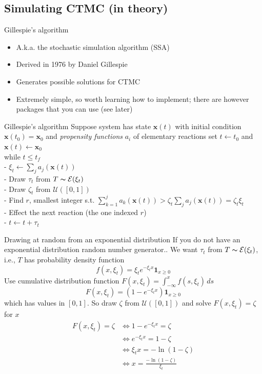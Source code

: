 \documentclass[aspectratio=169]{beamer}
\begin{document}
\subsection{Simulating CTMC (in theory)}

\begin{frame}{Gillespie's algorithm}
    \begin{itemize}
        \item A.k.a. the stochastic simulation algorithm (SSA)
        \item Derived in 1976 by Daniel Gillespie
        \item Generates possible solutions for CTMC
        \item Extremely simple, so worth learning how to implement; there are however packages that you can use (see later)
    \end{itemize}
\end{frame}


\begin{frame}{Gillespie's algorithm}
Suppose system has state $\mathbf{x}(t)$ with initial condition $\mathbf{x}(t_0)=\mathbf{x}_0$ and \emph{propensity functions} $a_i$ of elementary reactions
\vfill
set $t\leftarrow t_0$ and $\mathbf{x}(t)\leftarrow \mathbf{x}_0$\\
while {$t\leq t_f$}\\
- $\xi_t\leftarrow \sum_j a_j(\mathbf{x}(t))$\\
- Draw $\tau_t$ from $T\thicksim \mathcal{E}(\xi_t)$\\
- Draw $\zeta_t$ from $\mathcal{U}([0,1])$\\
- Find $r$, smallest integer s.t. $\sum_{k=1}^j a_k(\mathbf{x}(t))> \zeta_t\sum_j a_j(\mathbf{x}(t))=\zeta_t\xi_t$\\
- Effect the next reaction (the one indexed $r$)\\
- $t\leftarrow t+\tau_t$\\    
\end{frame}


\begin{frame}{Drawing at random from an exponential distribution}
    If you do not have an exponential distribution random number generator.. We want $\tau_t$ from $T\thicksim\mathcal{E}(\xi_t)$, i.e., $T$ has probability density function
    $$
    f(x,\xi_t)=
    \xi_te^{-\xi_t x}\mathbf{1}_{x\geq 0}
    $$
    Use cumulative distribution function $F(x,\xi_t)=\int_{-\infty}^x f(s,\xi_t)\,ds$
    $$
    F(x,\xi_t)=
    (1-e^{-\xi_t x})\mathbf{1}_{x\geq 0}
    $$
    which has values in $[0,1]$. So draw $\zeta$ from $\mathcal{U}([0,1])$ and solve $F(x,\xi_t)=\zeta$ for $x$
    \begin{align*}
    F(x,\xi_t)=\zeta & \Leftrightarrow 1-e^{-\xi_tx}=\zeta \\
    &\Leftrightarrow e^{-\xi_tx} = 1-\zeta \\
    &\Leftrightarrow \xi_tx = -\ln(1-\zeta) \\
    &\Leftrightarrow \boxed{x = \frac{-\ln(1-\zeta)}{\xi_t}}
    \end{align*}
\end{frame}
\end{document}
